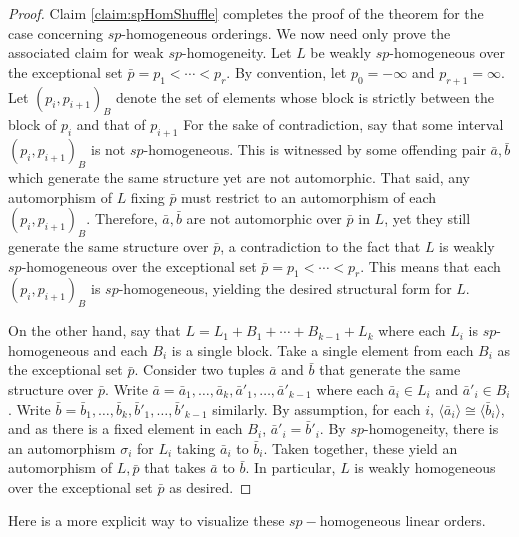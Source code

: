 \documentclass[11pt]{amsart}
\theoremstyle{definition}
\begin{document}
\begin{proof}
Claim \ref{claim:spHomShuffle} completes the proof of the theorem for the case concerning $sp$-homogeneous orderings.
We now need only prove the associated claim for weak $sp$-homogeneity. 
Let $L$ be weakly $sp$-homogeneous over the exceptional set $\bar{p}=p_1<\cdots<p_r$.
By convention, let $p_0=-\infty$ and $p_{r+1}=\infty$.
Let $(p_i,p_{i+1})_B$ denote the set of elements whose block is strictly between the block of $p_i$ and that of $p_{i+1}$
For the sake of contradiction, say that some interval $(p_i,p_{i+1})_B$ is not $sp$-homogeneous.
This is witnessed by some offending pair $\bar{a},\bar{b}$ which generate the same structure yet are not automorphic.
That said, any automorphism of $L$ fixing $\bar{p}$ must restrict to an automorphism of each $(p_i,p_{i+1})_B$.
Therefore, $\bar{a},\bar{b}$ are not automorphic over $\bar{p}$ in $L$, yet they still generate the same structure over $\bar{p}$, a contradiction to the fact that $L$ is weakly $sp$-homogeneous over the exceptional set $\bar{p}=p_1<\cdots<p_r$.
This means that each $(p_i,p_{i+1})_B$ is $sp$-homogeneous, yielding the desired structural form for $L$.

On the other hand, say that $L=L_1+B_1+\cdots+B_{k-1}+L_{k}$ where each $L_i$ is $sp$-homogeneous and each $B_i$ is a single block.
Take a single element from each $B_i$ as the exceptional set $\bar{p}$.
Consider two tuples $\bar{a}$ and $\bar{b}$ that generate the same structure over $\bar{p}$.
Write $\bar{a}=\bar{a}_1,\dots,\bar{a}_k,\bar{a}'_1,\dots,\bar{a}'_{k-1}$ where each $\bar{a}_i\in L_i$ and $\bar{a}'_i\in B_i$.
Write $\bar{b}=\bar{b}_1,\dots,\bar{b}_k,\bar{b}'_1,\dots,\bar{b}'_{k-1}$ similarly.
By assumption, for each $i$, $\langle\bar{a}_i\rangle\cong\langle\bar{b}_i\rangle$, and as there is a fixed element in each $B_i$, $\bar{a}'_i=\bar{b}'_i$.
By $sp$-homogeneity, there is an automorphism $\sigma_i$ for $L_i$ taking $\bar{a}_i$ to $\bar{b}_i$.
Taken together, these yield an automorphism of $L,\bar{p}$ that takes $\bar{a}$ to $\bar{b}$.
In particular, $L$ is weakly homogeneous over the exceptional set $\bar{p}$ as desired.
\end{proof}



Here is a more explicit way to visualize these $sp-$homogeneous linear orders. 
\end{document}
